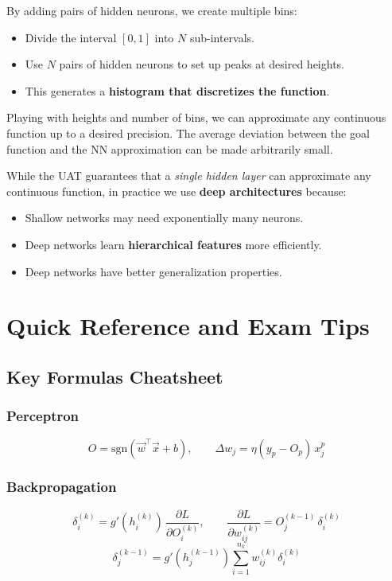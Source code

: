 \documentclass[11pt,a4paper]{article}
\newcommand{\sgn}{\text{sgn}}
\begin{document}
By adding pairs of hidden neurons, we create multiple bins:
\begin{itemize}[leftmargin=*]
    \item Divide the interval $[0,1]$ into $N$ sub-intervals.
    \item Use $N$ pairs of hidden neurons to set up peaks at desired heights.
    \item This generates a \textbf{histogram that discretizes the function}.
\end{itemize}

Playing with heights and number of bins, we can approximate any continuous function up to a desired precision. The average deviation between the goal function and the NN approximation can be made arbitrarily small.

\begin{keybox}[title=Practical Implication]
While the UAT guarantees that a \emph{single hidden layer} can approximate any continuous function, in practice we use \textbf{deep architectures} because:
\begin{itemize}[leftmargin=*]
    \item Shallow networks may need exponentially many neurons.
    \item Deep networks learn \textbf{hierarchical features} more efficiently.
    \item Deep networks have better generalization properties.
\end{itemize}
\end{keybox}

\newpage
\section{Quick Reference and Exam Tips}

\subsection{Key Formulas Cheatsheet}

\subsubsection{Perceptron}
\[
O = \sgn(\vec{w}^\top \vec{x} + b), \qquad
\Delta w_j = \eta(y_p - O_p)\, x_j^p
\]

\subsubsection{Backpropagation}
\[
\delta_i^{(k)} = g'(h_i^{(k)})\,\frac{\partial L}{\partial O_i^{(k)}}, \qquad
\frac{\partial L}{\partial w_{ij}^{(k)}} = O_j^{(k-1)}\,\delta_i^{(k)}
\]
\[
\delta_j^{(k-1)} = g'(h_j^{(k-1)})\sum_{i=1}^{n_k} w_{ij}^{(k)}\delta_i^{(k)}
\]
\end{document}
